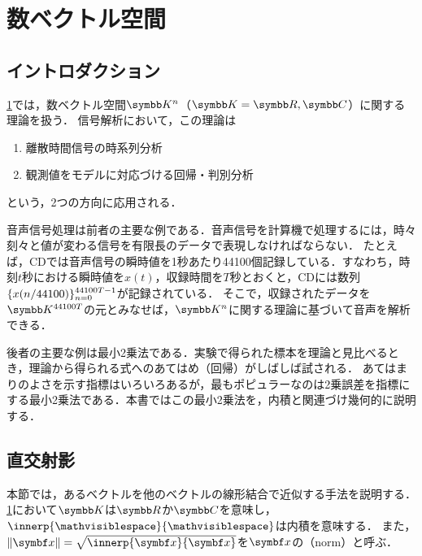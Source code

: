 \documentclass[../../main]{subfiles}
\begin{document}
\chapter{数ベクトル空間}
\label{chapter:numerical_vector_space}

\section{イントロダクション}
\label{section:numerical_vector_space_introduction}

\cref{chapter:numerical_vector_space}では，数ベクトル空間\(\numset{K}^n\)（\(\numset{K}=\numset{R},\numset{C}\)）に関する理論を扱う．
信号解析において，この理論は
\begin{enumerate}
  \item 離散時間信号の時系列分析
  \item 観測値をモデルに対応づける回帰・判別分析
\end{enumerate}
という，2つの方向に応用される．

音声信号処理は前者の主要な例である．音声信号を計算機で処理するには，時々刻々と値が変わる信号を有限長のデータで表現しなければならない．
たとえば，CDでは音声信号の瞬時値を1秒あたり44100個記録している．すなわち，時刻\(t\)秒における瞬時値を\(x(t)\)，収録時間を\(T\)秒とおくと，CDには数列\(\lbrace x(n/44100)\rbrace_{n=0}^{44100T-1}\)が記録されている．
そこで，収録されたデータを\(\numset{K}^{44100T}\)の元とみなせば，\(\numset{K}^n\)に関する理論に基づいて音声を解析できる．

後者の主要な例は最小2乗法である．実験で得られた標本を理論と見比べるとき，理論から得られる式へのあてはめ（回帰）がしばしば試される．
あてはまりのよさを示す指標はいろいろあるが，最もポピュラーなのは2乗誤差を指標にする最小2乗法である．本書ではこの最小2乗法を，内積と関連づけ幾何的に説明する．

\pagebreak

\section{直交射影}
\label{section:finite_projection}

本節では，あるベクトルを他のベクトルの線形結合で近似する手法を説明する．
\cref{chapter:numerical_vector_space}において\(\numset{K}\)は\(\numset{R}\)か\(\numset{C}\)を意味し，\(\innerp{\holder}{\holder}\)は内積を意味する．
また，\(\vnorm{\vect{x}}=\sqrt{\innerp{\vect{x}}{\vect{x}}}\)を\(\vect{x}\)の\indexsymbol{\(\vnorm{\holder}\)}（norm）と呼ぶ．
\end{document}
